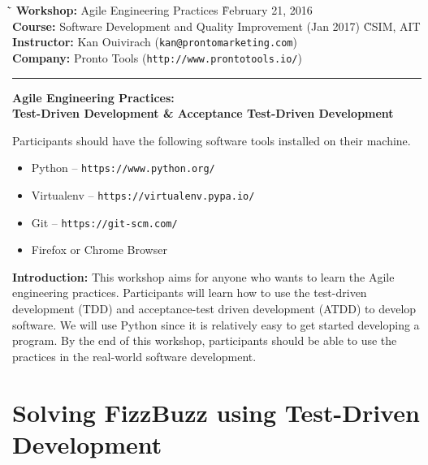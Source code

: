 \documentclass{article}
\begin{document}
\begin{tabbing}
  \`\=\kill
  \textbf{Workshop:} Agile Engineering Practices
  \` February 21, 2016 \\
  \textbf{Course: } Software Development and Quality Improvement (Jan 2017)
  \` CSIM, AIT \\
  \textbf{Instructor:} Kan Ouivirach ({\tt \small kan@prontomarketing.com}) \\
  \textbf{Company:} Pronto Tools ({\tt \small http://www.prontotools.io/})
\end{tabbing}

\hrule

\vspace{.25in}

\begin{center}
  \textbf{\Large Agile Engineering Practices:} \\
  \vspace{.1in}
  \textbf{\large Test-Driven Development \& Acceptance Test-Driven Development}
\end{center}

\vspace{.15in}

 Participants should have the following software
tools installed on their machine.

\begin{itemize}
  \item Python -- {\tt https://www.python.org/}
  \item Virtualenv -- {\tt https://virtualenv.pypa.io/}
  \item Git -- {\tt https://git-scm.com/}
  \item Firefox or Chrome Browser
\end{itemize}

\noindent \textbf{Introduction:} This workshop aims for anyone who wants to
learn the Agile engineering practices. Participants will learn how to use the
test-driven development (TDD) and acceptance-test driven development (ATDD) to
develop software. We will use Python since it is relatively easy to get started
developing a program. By the end of this workshop, participants should be able
to use the practices in the real-world software development.

\section*{Solving FizzBuzz using Test-Driven Development}
\end{document}
